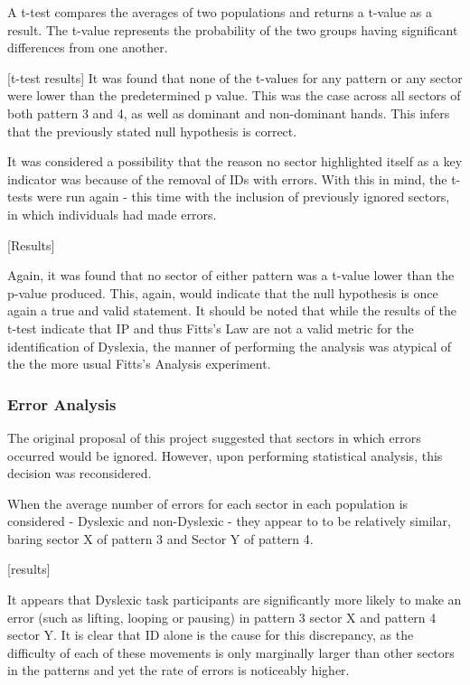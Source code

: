 		A t-test compares the averages of two populations and returns a t-value as a result. The t-value represents the probability of the two groups having significant differences from one  another. 

		[t-test results]
		It was found that none of the t-values for any pattern or any sector were lower than the predetermined p value. This was the case across all sectors of both pattern 3 and 4, as well as dominant and non-dominant hands. This infers that the previously stated null hypothesis is correct. 

		It was considered a possibility that the reason no sector highlighted itself as a key indicator was because of the removal of IDs with errors. With this in mind, the t-tests were run again - this time with the inclusion of previously ignored sectors, in which individuals had made errors.

		[Results]

		Again, it was found that no sector of either pattern was a t-value lower than the p-value produced. This, again, would indicate that the null hypothesis is once again a true and valid statement.
		It should be noted that while the results of the t-test indicate that IP and thus Fitts’s Law are not a valid metric for the identification of Dyslexia, the manner of performing the analysis was atypical of the the more usual Fitts’s Analysis experiment.

	\subsubsection{Error Analysis}
		The original proposal of this project suggested that sectors in which errors occurred would be ignored. However, upon performing statistical analysis, this decision was reconsidered.
		
		When the average number of errors for each sector in each population is considered - Dyslexic and non-Dyslexic - they appear to to be relatively similar, baring sector X of pattern 3 and Sector Y of pattern 4.
		
		[results]
		
		It appears that Dyslexic task participants are significantly more likely to make an error (such as lifting, looping or pausing) in pattern 3 sector X and pattern 4 sector Y. It is clear that ID alone is the cause for this discrepancy, as the difficulty of each of these movements is only marginally larger than other sectors in the patterns and yet the rate of errors is noticeably higher.
		
